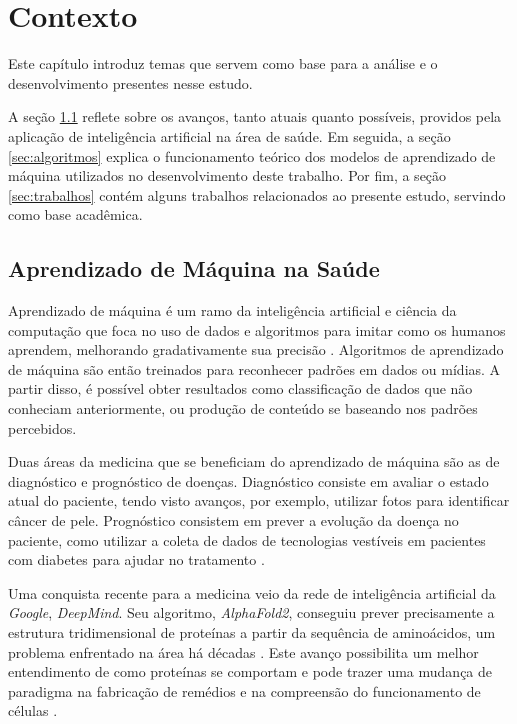 \chapter{Contexto}
\label{chap:contexto}

Este capítulo introduz temas que servem como base para a análise e o desenvolvimento presentes nesse estudo.

A seção \ref{sec:ia-na-saude} reflete sobre os avanços, tanto atuais quanto possíveis, providos pela aplicação de inteligência artificial na área de saúde. Em seguida, a seção \ref{sec:algoritmos} explica o funcionamento teórico dos modelos de aprendizado de máquina utilizados no desenvolvimento deste trabalho. Por fim, a seção \ref{sec:trabalhos} contém alguns trabalhos relacionados ao presente estudo, servindo como base acadêmica.


\section{Aprendizado de Máquina na Saúde}
\label{sec:ia-na-saude}

Aprendizado de máquina é um ramo da inteligência artificial e ciência da computação que foca no uso de dados e algoritmos para imitar como os humanos aprendem, melhorando gradativamente sua precisão \cite{ibm}. Algoritmos de aprendizado de máquina são então treinados para reconhecer padrões em dados ou mídias. A partir disso, é possível obter resultados como classificação de dados que não conheciam anteriormente, ou produção de conteúdo se baseando nos padrões percebidos.

Duas áreas da medicina que se beneficiam do aprendizado de máquina são as de diagnóstico e prognóstico de doenças. Diagnóstico consiste em avaliar o estado atual do paciente, tendo visto avanços, por exemplo, utilizar fotos para identificar câncer de pele. Prognóstico consistem em prever a evolução da doença no paciente, como utilizar a coleta de dados de tecnologias vestíveis em pacientes com diabetes para ajudar no tratamento \cite{ml-medicina}.

Uma conquista recente para a medicina veio da rede de inteligência artificial da \textit{Google}, \textit{DeepMind}. Seu algoritmo, \textit{AlphaFold2}, conseguiu prever precisamente a estrutura tridimensional de proteínas a partir da sequência de aminoácidos, um problema enfrentado na área há décadas \cite{deepmind}. Este avanço possibilita um melhor entendimento de como proteínas se comportam e pode trazer uma mudança de paradigma na fabricação de remédios e na compreensão do funcionamento de células \cite{deepmind2}.

